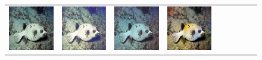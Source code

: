 \begin{figure}[t]
\begin{center}
\begin{tabular}{ccccccccc}
			\includegraphics[width = 0.10\linewidth,height=0.10\linewidth]{figures/ch3/compare/EUVP/Ucolor/264318_n02655020_17544.JPEG}& \hspace{-0.40cm}
			\includegraphics[width = 0.10\linewidth,height=0.10\linewidth]{figures/ch3/compare/EUVP/STSC/264318_n02655020_17544.JPEG}  & \hspace{-0.40cm}
			\includegraphics[width = 0.10\linewidth,height=0.10\linewidth]{figures/ch3/compare/EUVP/Ushape/264318_n02655020_17544.JPEG}& \hspace{-0.40cm} 
            \includegraphics[width = 0.10\linewidth,height=0.10\linewidth]{figures/ch3/compare/EUVP/Ours/264318_n02655020_17544..png}  \\
                

\end{tabular}
\end{center}
\end{figure}
